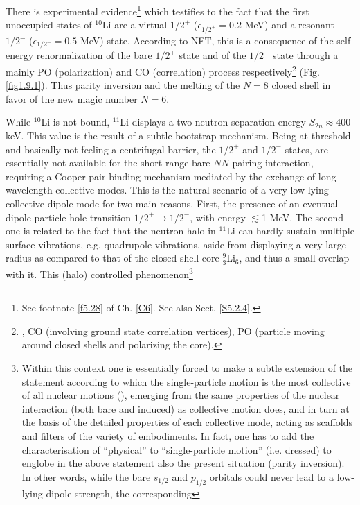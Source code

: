  
 
There is  experimental evidence\footnote{See footnote \ref{f5.28} of Ch. \ref{C6}. See also Sect. \ref{S5.2.4}.} which testifies to the fact that the first unoccupied states of $^{10}$Li are a virtual $1/2^+$ ($\epsilon_{1/2^+}=0.2$ MeV) and a resonant $1/2^-$ ($\epsilon_{1/2^-}=0.5$ MeV) state.   According to NFT, this is a consequence of the self-energy renormalization of the bare $1/2^+$ state and of the $1/2^-$ state through a mainly PO (polarization) and CO (correlation) process respectively\footnote{\cite{Barranco:01}, CO (involving ground state correlation vertices), PO (particle moving around closed shells and polarizing the core).} (Fig. \ref{fig1.9.1}). Thus parity inversion and the melting of  the $N=8$ closed shell in favor of the new magic number $N=6$. 


While $^{10}$Li is not bound, $^{11}$Li displays a two-neutron separation energy $S_{2n}\approx400$ keV.  This value  is the result of a subtle bootstrap mechanism. Being at threshold and basically not feeling a centrifugal barrier, the $1/2^+$ and $1/2^-$ states, are essentially not available for the short range bare $NN$-pairing interaction, requiring a Cooper pair binding mechanism mediated by  the exchange of  long wavelength collective modes. This is the natural scenario of a very low-lying collective dipole mode for two main reasons. First, the presence of an eventual dipole particle-hole transition $1/2^+\rightarrow 1/2^-$, with energy  $\lesssim$1 MeV. The second one is related to  the fact that the neutron halo in $^{11}$Li can hardly sustain multiple surface vibrations, e.g. quadrupole vibrations, aside from displaying a very large radius as compared to that of the closed shell core $^9_3$Li$_6$, and thus a small overlap with it. This (halo)  controlled phenomenon\footnote{Within this context one is essentially forced to make a subtle  extension of the statement according to which  the single-particle motion is the most collective  
of all nuclear motions (\cite{Mottelson:62}), emerging from  the same properties  of the nuclear interaction 
(both bare and induced) as collective motion does, 
and in turn at the basis of the detailed properties of each collective mode, acting as
 scaffolds and filters of the variety of embodiments. In fact, one 
has  to add the characterisation of ``physical'' to ``single-particle motion'' (i.e. dressed) to englobe in  the above statement 
also the present  situation (parity inversion). In other words, while the bare $s_{1/2}$ and $p_{1/2}$ orbitals could never lead to a low-lying dipole strength, the corresponding 
}
